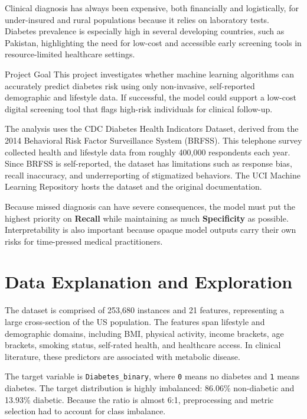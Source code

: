 \documentclass[11pt,letterpaper]{article}
\begin{document}
Clinical diagnosis has always been expensive, both financially and logistically, for under-insured and rural populations because it relies on laboratory tests. Diabetes prevalence is especially high in several developing countries, such as Pakistan, highlighting the need for low-cost and accessible early screening tools in resource-limited healthcare settings.

\begin{insightbox}{Project Goal}
This project investigates whether machine learning algorithms can accurately predict diabetes risk using only non-invasive, self-reported demographic and lifestyle data. If successful, the model could support a low-cost digital screening tool that flags high-risk individuals for clinical follow-up.
\end{insightbox}

The analysis uses the CDC Diabetes Health Indicators Dataset, derived from the 2014 Behavioral Risk Factor Surveillance System (BRFSS). This telephone survey collected health and lifestyle data from roughly 400,000 respondents each year. Since BRFSS is self-reported, the dataset has limitations such as response bias, recall inaccuracy, and underreporting of stigmatized behaviors. The UCI Machine Learning Repository hosts the dataset and the original documentation.

Because missed diagnosis can have severe consequences, the model must put the highest priority on \textbf{Recall} while maintaining as much \textbf{Specificity} as possible. Interpretability is also important because opaque model outputs carry their own risks for time-pressed medical practitioners.

\section{Data Explanation and Exploration}
The dataset is comprised of 253,680 instances and 21 features, representing a large cross-section of the US population. The features span lifestyle and demographic domains, including BMI, physical activity, income brackets, age brackets, smoking status, self-rated health, and healthcare access. In clinical literature, these predictors are associated with metabolic disease.

The target variable is \texttt{Diabetes\_binary}, where \texttt{0} means no diabetes and \texttt{1} means diabetes. The target distribution is highly imbalanced: 86.06\% non-diabetic and 13.93\% diabetic. Because the ratio is almost 6:1, preprocessing and metric selection had to account for class imbalance.
\end{document}
